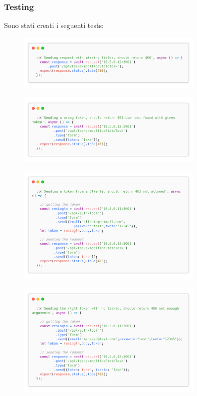 \documentclass{report}
\begin{document}
\subsubsection*{Testing}

Sono stati creati i seguenti tests:

\begin{figure}[H]
	\centering\includegraphics[width=0.8\textwidth]{images/code_modifica_stato_test1.png}
\end{figure}
\begin{figure}[H]
	\centering\includegraphics[width=0.8\textwidth]{images/code_modifica_stato_test2.png}
\end{figure}
\begin{figure}[H]
	\centering\includegraphics[width=0.8\textwidth]{images/code_modifica_stato_test3.png}
\end{figure}
\begin{figure}[H]
	\centering\includegraphics[width=0.8\textwidth]{images/code_modifica_stato_test4.png}
\end{figure}
\end{document}
